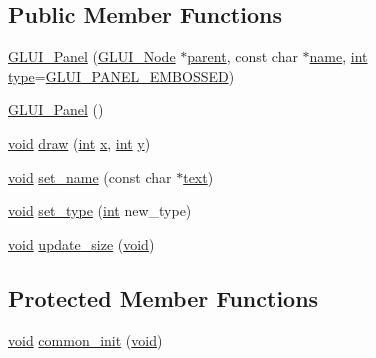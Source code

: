 \subsection*{Public Member Functions}
\begin{DoxyCompactItemize}
\item 
\hyperlink{class_g_l_u_i___panel_a6a297a441e3f921199347184ded52aca}{G\+L\+U\+I\+\_\+\+Panel} (\hyperlink{class_g_l_u_i___node}{G\+L\+U\+I\+\_\+\+Node} $\ast$\hyperlink{class_g_l_u_i___node_a8ed65d447784f6f88bd3e2e2bcac6cdb}{parent}, const char $\ast$\hyperlink{glext_8h_ad977737dfc9a274a62741b9500c49a32}{name}, \hyperlink{wglext_8h_a500a82aecba06f4550f6849b8099ca21}{int} \hyperlink{glext_8h_ab7c1afc09f67635c2c376638fcc0db5f}{type}=\hyperlink{glui_8h_add54979a7b4391067b8a125ee34f690a}{G\+L\+U\+I\+\_\+\+P\+A\+N\+E\+L\+\_\+\+E\+M\+B\+O\+S\+S\+E\+D})
\item 
\hyperlink{class_g_l_u_i___panel_a8b3bd4012d7a33a9c420a67a58e83a87}{G\+L\+U\+I\+\_\+\+Panel} ()
\item 
\hyperlink{wglext_8h_a9e6b7f1933461ef318bb000d6bd13b83}{void} \hyperlink{class_g_l_u_i___panel_a8038a76f6c88613735f7c65ae9466b0c}{draw} (\hyperlink{wglext_8h_a500a82aecba06f4550f6849b8099ca21}{int} \hyperlink{glext_8h_ad77deca22f617d3f0e0eb786445689fc}{x}, \hyperlink{wglext_8h_a500a82aecba06f4550f6849b8099ca21}{int} \hyperlink{glext_8h_a9298c7ad619074f5285b32c6b72bfdea}{y})
\item 
\hyperlink{wglext_8h_a9e6b7f1933461ef318bb000d6bd13b83}{void} \hyperlink{class_g_l_u_i___panel_a5f76f22a34d3c131e3ace71d24c47d3e}{set\+\_\+name} (const char $\ast$\hyperlink{class_g_l_u_i___control_af0d60e9736f4dbc34e9a536e75876d72}{text})
\item 
\hyperlink{wglext_8h_a9e6b7f1933461ef318bb000d6bd13b83}{void} \hyperlink{class_g_l_u_i___panel_aee5e41798d60ac2e4707373be14fd39f}{set\+\_\+type} (\hyperlink{wglext_8h_a500a82aecba06f4550f6849b8099ca21}{int} new\+\_\+type)
\item 
\hyperlink{wglext_8h_a9e6b7f1933461ef318bb000d6bd13b83}{void} \hyperlink{class_g_l_u_i___panel_ab377b608f9b1006fb67d78e41a1f95d6}{update\+\_\+size} (\hyperlink{wglext_8h_a9e6b7f1933461ef318bb000d6bd13b83}{void})
\end{DoxyCompactItemize}
\subsection*{Protected Member Functions}
\begin{DoxyCompactItemize}
\item 
\hyperlink{wglext_8h_a9e6b7f1933461ef318bb000d6bd13b83}{void} \hyperlink{class_g_l_u_i___panel_ac8a587cbc0b8640824cbdee00d8a0462}{common\+\_\+init} (\hyperlink{wglext_8h_a9e6b7f1933461ef318bb000d6bd13b83}{void})
\end{DoxyCompactItemize}
